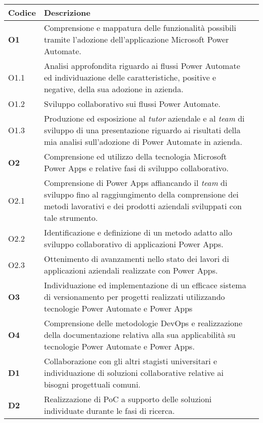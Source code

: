 \begin{table}[htbp]
    \label{tab:obiettiviProgettuali}
    \renewcommand{\arraystretch}{1.5}
    \begin{tabularx}{\textwidth}{|l|X|l|}
    \hline
    \textbf{Codice} & \textbf{Descrizione}\\
    \hline \textbf{O1}    & Comprensione e mappatura delle funzionalità possibili tramite l'adozione dell'applicazione Microsoft Power Automate.\\
    \hline O1.1  & Analisi approfondita riguardo ai flussi Power Automate ed individuazione delle caratteristiche, positive e negative, della sua adozione in azienda.\\
    \hline O1.2  & Sviluppo collaborativo sui flussi Power Automate.\\
    \hline O1.3  & Produzione ed esposizione al \emph{tutor} aziendale e al \emph{team} di sviluppo di una presentazione riguardo ai risultati della mia analisi sull'adozione di Power Automate in azienda.\\
    \hline \textbf{O2}  & Comprensione ed utilizzo della tecnologia Microsoft Power Apps e relative fasi di sviluppo collaborativo.\\
    \hline O2.1  & Comprensione di Power Apps affiancando il \emph{team} di sviluppo fino al raggiungimento della comprensione dei metodi lavorativi e dei prodotti aziendali sviluppati con tale strumento.\\
    \hline O2.2  & Identificazione e definizione di un metodo adatto allo sviluppo collaborativo di applicazioni Power Apps.\\
    \hline O2.3  & Ottenimento di avanzamenti nello stato dei lavori di applicazioni aziendali realizzate con Power Apps.\\
    \hline \textbf{O3}  & Individuazione ed implementazione di un efficace sistema di versionamento per progetti realizzati utilizzando tecnologie Power Automate e Power Apps\\
    \hline \textbf{O4}  & Comprensione delle metodologie \gls{DevOps} e realizzazione della documentazione relativa alla sua applicabilità su tecnologie Power Automate e Power Apps.\\
    \hline
    \hline \textbf{D1}  & Collaborazione con gli altri stagisti universitari e individuazione di soluzioni collaborative relative ai bisogni progettuali comuni.\\
    \hline \textbf{D2}  & Realizzazione di PoC a supporto delle soluzioni individuate durante le fasi di ricerca.\\

\end{tabularx}
\end{table}
